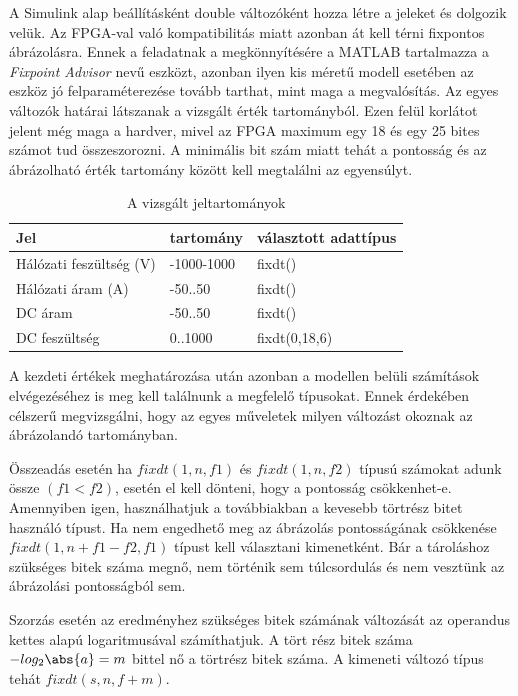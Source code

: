 A Simulink alap beállításként double változóként hozza létre a jeleket és dolgozik velük. Az FPGA-val való kompatibilitás miatt azonban át kell térni fixpontos ábrázolásra. Ennek a feladatnak a megkönnyítésére a MATLAB tartalmazza a \emph{Fixpoint Advisor} nevű eszközt, azonban ilyen kis méretű modell esetében az eszköz jó felparaméterezése tovább tarthat, mint maga a megvalósítás. Az egyes változók határai látszanak a vizsgált érték tartományból. Ezen felül korlátot jelent még maga a hardver, mivel az FPGA maximum egy 18 és egy 25 bites számot tud összeszorozni. A minimális bit szám miatt tehát a pontosság és az ábrázolható érték tartomány között kell megtalálni az egyensúlyt.

\begin{table}[]
\centering
\begin{tabular}{|l|l|l|}
\hline
Jel  					&		 tartomány              & választott adattípus \\ \hline
Hálózati feszültség (V) & -1000-1000          	 		& fixdt()\\ \hline
Hálózati áram (A) 		& -50..50						& fixdt()\\ \hline
DC áram 				& -50..50        	   	   		& fixdt() \\ \hline
DC feszültség  			& 0..1000     			 		& fixdt(0,18,6)    \\ \hline
\end{tabular}
\caption{A vizsgált jeltartományok}
\label{tab:values}
\end{table} 


A kezdeti értékek meghatározása után azonban a modellen belüli számítások elvégezéséhez is meg kell találnunk a megfelelő típusokat. Ennek érdekében célszerű megvizsgálni, hogy az egyes műveletek milyen változást okoznak az ábrázolandó tartományban.

Összeadás esetén ha $fixdt(1,n,f1)$ és $fixdt(1,n,f2)$ típusú számokat adunk össze $(f1 < f2)$, esetén el kell dönteni, hogy a pontosság csökkenhet-e. Amennyiben igen, használhatjuk a továbbiakban a kevesebb törtrész bitet használó típust. Ha nem engedhető meg az ábrázolás pontosságának csökkenése $fixdt(1,n+f1-f2,f1)$ típust kell választani kimenetként. Bár a tároláshoz szükséges bitek száma megnő, nem történik sem túlcsordulás és nem vesztünk az ábrázolási pontosságból sem.

Szorzás esetén az eredményhez szükséges bitek számának változását az operandus kettes alapú logaritmusával számíthatjuk. A tört rész bitek száma $-log_2\abs{a} = m$ bittel nő a törtrész bitek száma. A kimeneti változó típus tehát $fixdt(s,n,f+m)$.

